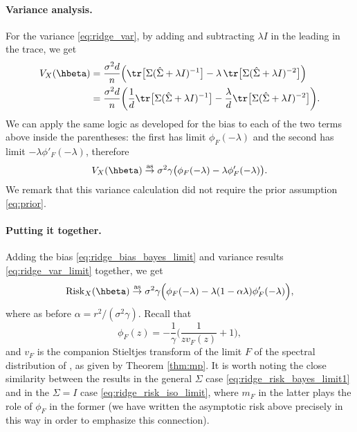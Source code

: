 \documentclass{article}
\begin{document}
\paragraph{Variance analysis.}

For the variance \eqref{eq:ridge_var}, by adding and subtracting $\lambda I$ in
the leading \smash{$\hSigma$} in the trace, we get 
\begin{align*}
V_X(\hbeta) 
&= \frac{\sigma^2 d}{n} \Big( \tr \big[ \Sigma ( \hSigma + \lambda I)^{-1} \big] -
  \lambda \, \tr \big[ \Sigma (\hSigma + \lambda I)^{-2} \big] \Big) \\
&= \frac{\sigma^2 d}{n} \bigg( \frac{1}{d} \tr \big[ \Sigma ( \hSigma + \lambda 
  I)^{-1} \big] -\frac{\lambda}{d} \tr \big[ \Sigma (\hSigma + \lambda I)^{-2} 
  \big] \bigg).
\end{align*}
We can apply the same logic as developed for the bias to each of the two terms
above inside the parentheses: the first has limit $\phi_F(-\lambda)$ and the
second has limit $-\lambda \phi'_F(-\lambda)$, therefore   
\begin{equation}
\label{eq:ridge_var_limit}
V_X(\hbeta) \asto \sigma^2 \gamma \big( \phi_F(-\lambda) - \lambda 
\phi'_F(-\lambda) \big).
\end{equation}
We remark that this variance calculation did not require the prior assumption
\eqref{eq:prior}.  

\paragraph{Putting it together.}

Adding the bias \eqref{eq:ridge_bias_bayes_limit} and variance results
\eqref{eq:ridge_var_limit} together, we get
\begin{equation}
\label{eq:ridge_risk_bayes_limit1}
\Risk_X(\hbeta) \asto \sigma^2 \gamma \Big( \phi_F(-\lambda) - \lambda (1 -
\alpha \lambda) \phi'_F(-\lambda) \Big),  
\end{equation}
where as before $\alpha = r^2 / (\sigma^2 \gamma)$. Recall that 
 \[
\phi_F(z) = -\frac{1}{\gamma} \bigg( \frac{1}{z v_F(z)} + 1 \bigg),
\]
and $v_F$ is the companion Stieltjes transform of the limit $F$ of the spectral
distribution of \smash{$\hSigma$}, as given by Theorem \ref{thm:mp}. It is worth
noting the close similarity between the results in the general $\Sigma$ case
\eqref{eq:ridge_risk_bayes_limit1} and in the $\Sigma = I$ case
\eqref{eq:ridge_risk_iso_limit}, where $m_F$ in the latter plays the role of 
$\phi_F$ in the former (we have written the asymptotic risk above precisely in
this way in order to emphasize this connection). 
\end{document}
